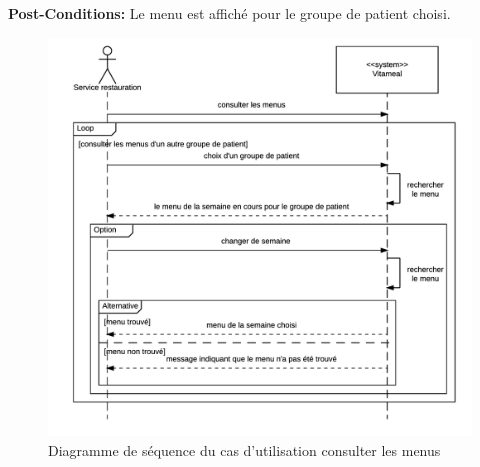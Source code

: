 \noindent \textbf{Post-Conditions:} Le menu est affiché pour le groupe de patient choisi.

\begin{figure}
\centering
\includegraphics[scale=0.75]{../../CasDUtilisations/ConsulterMenus/sequence_consulter_menus.png}
\caption{Diagramme de séquence du cas d'utilisation consulter les menus}
\end{figure}